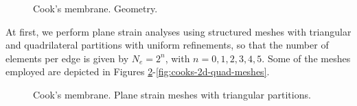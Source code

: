 \documentclass[english,11pt,3p,number,sort&compress]{elsarticle}
\begin{document}
\begin{figure}[H]
    \centering
    
    \caption{Cook's membrane. Geometry.}
    \label{fig:cooks-geometry}
\end{figure}

At first, we perform plane strain analyses using structured meshes with triangular and quadrilateral partitions with uniform refinements, so that the number of elements per edge is given by $N_e=2^n$, with $n={0,1,2,3,4,5}$. Some of the meshes employed are depicted in Figures \ref{fig:cooks-2d-tri-meshes}-\ref{fig:cooks-2d-quad-meshes}.

\begin{figure}[H]
	\centering
	\caption{Cook's membrane. Plane strain meshes with triangular partitions.}
	\label{fig:cooks-2d-tri-meshes}
\end{figure}
\end{document}
